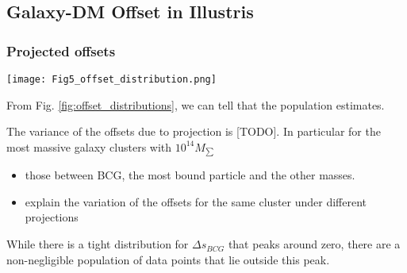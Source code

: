 \subsection{Galaxy-DM Offset in Illustris}

\subsubsection{Projected offsets}
\begin{figure*}
	\begin{center}
	\texttt{[image: Fig5\_offset\_distribution.png]}
	\caption{ 		
		The distribution of different offsets of [TODO] clusters with [TODO]
		projections. The dark blue area indicates the 68\% confidence interval
		while the light blue area shows the 95\% confidence interval. 
		We provide two ways of summarizing the offsets, the {\bf left column} shows
		the offsets when we randomly denote the sign of the offset. The
		direction of the offset in the Illustris simulation without SIDM has no 
		physical meaning.
		The estimates of the offsets on the left are all consistent with 0 within
		the 68\% confidence interval.
		On the {\bf right column}, we plot {\it the same data} after taking the
		absolute magnitude. The estimates from the absolute magnitude of the
		offsets are pushed towards larger values due to the cutoff at zero from
		taking the absolute values. None of the estimates from the
		absolute offsets is consistent with 0 within the 68\% interval.
				\label{fig:offset_distributions}
	}
\end{center}
\end{figure*}

From Fig. \ref{fig:offset_distributions}, we can tell that the population 
estimates. 

The variance of the offsets due to projection is [TODO].
In particular for the most massive galaxy clusters with $10^{14} M_{\sum}$



\begin{itemize}
\item those between BCG, the most bound particle and the other masses. 
\item explain the variation of the offsets for the same cluster under different 
projections 
\end{itemize}

While there is a tight distribution for $\Delta s_{BCG}$ that peaks around
zero, there are a non-negligible population of data points that lie outside
this peak. 

